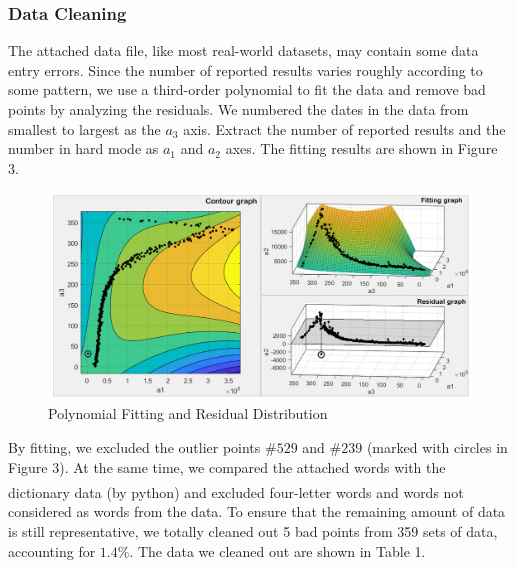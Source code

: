 \documentclass[12pt]{article}
\newcommand{\upcite}[1]{\textsuperscript{\textsuperscript{\cite{#1}}}}
\begin{document}
\subsubsection{Data Cleaning}
The attached data file, like most real-world datasets, may contain some data entry errors. 
Since the number of reported results varies roughly according to some pattern, we use a third-order polynomial to fit the data and remove bad points by analyzing the residuals.
We numbered the dates in the data from smallest to largest as the $a_3$ axis. Extract the number of reported results and the number in hard mode as $a_1$ and $a_2$ axes. The fitting results are shown in Figure 3.
\begin{figure}[H]
    \centering
    \includegraphics[scale=0.53]{1_1datafit.png}
    \caption{Polynomial Fitting and Residual Distribution}
\end{figure}%
By fitting, we excluded the outlier points $\#529$ and $\#239$ (marked with circles in Figure 3).
At the same time, we compared the attached words with the dictionary data\upcite{3} (by python) and excluded four-letter words and words not considered as words from the data. 
To ensure that the remaining amount of data is still representative, we totally cleaned out 5 bad points from 359 sets of data, accounting for $1.4\%$.
The data we cleaned out are shown in Table 1.
\begin{table}[h]
	\begin{center}
        \caption{The Data Cleaned Out}
	\end{center}
\end{table}
\end{document}
